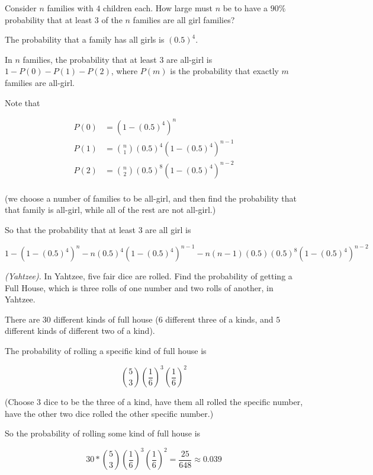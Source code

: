 \begin{problem}[Handout 5, \# 8]
  Consider \(n\) families with \(4\) children each. How large must \(n\) be
  to have a \(90\%\) probability that at least \(3\) of the \(n\) families
  are all girl families?
\end{problem}
\begin{solution}
The probability that a family has all girls is $(0.5)^4$.

In $n$ families, the probability that at least $3$ are all-girl is $1-P(0)-P(1)-P(2)$, where $P(m)$ is the probability that exactly $m$ families are all-girl.

Note that

\begin{align*}
P(0) &= (1-(0.5)^4)^n \\
P(1) &= \binom{n}{1}(0.5)^4(1-(0.5)^4)^{n-1} \\
P(2) &= \binom{n}{2}(0.5)^8(1-(0.5)^4)^{n-2} \\
\end{align*}

(we choose a number of families to be all-girl, and then find the probability that that family is all-girl, while all of the rest are not all-girl.)

So that the probability that at least $3$ are all girl is

\[
1-(1-(0.5)^4)^n - n(0.5)^4(1-(0.5)^4)^{n-1} - n(n-1)(0.5)(0.5)^8(1-(0.5)^4)^{n-2}
\]


\end{solution}
\newpage

\begin{problem}[Handout 5, \# 10]
  \emph{(Yahtzee).} In Yahtzee, five fair dice are rolled. Find the
  probability of getting a Full House, which is three rolls of one number
  and two rolls of another, in Yahtzee.
\end{problem}
\begin{solution}
There are $30$ different kinds of full house ($6$ different three of a kinds, and $5$ different kinds of different two of a kind).

The probability of rolling a specific kind of full house is

\[
\binom{5}{3} \left( \frac{1}{6}\right)^3 \left(\frac{1}{6} \right)^2
\]

(Choose 3 dice to be the three of a kind, have them all rolled the specific number, have the other two dice rolled the other specific number.)

So the probability of rolling some kind of full house is

\[
30* \binom{5}{3} \left( \frac{1}{6}\right)^3 \left(\frac{1}{6} \right)^2 = \frac{25}{648} \approx 0.039
\]

\end{solution}
\newpage

